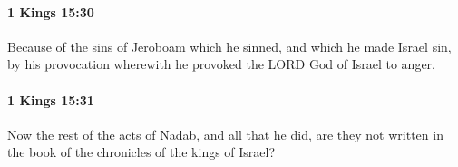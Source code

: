 		\paragraph{1 Kings 15:30} %
			\label{1KINGS-15-30}

			Because of the sins of Jeroboam which he sinned, and which he made Israel sin, by his provocation wherewith he provoked the LORD God of Israel to anger.


		\paragraph{1 Kings 15:31} %
			\label{1KINGS-15-31}

			Now the rest of the acts of Nadab, and all that he did, are they not written in the book of the chronicles of the kings of Israel?



